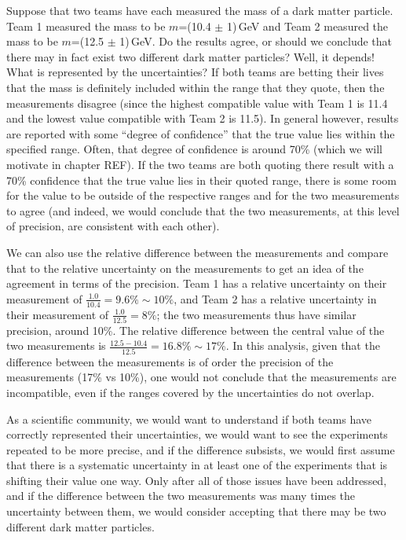 Suppose that two teams have each measured the mass of a dark matter particle. Team 1 measured the mass to be $m$=(10.4 $\pm$ 1)\,GeV and Team 2 measured the mass to be $m$=(12.5 $\pm$ 1)\,GeV. Do the results agree, or should we conclude that there may in fact exist two different dark matter particles? Well, it depends! What is represented by the uncertainties? If both teams are betting their lives that the mass is definitely included within the range that they quote, then the measurements disagree (since the highest compatible value with Team 1 is 11.4 and the lowest value compatible with Team 2 is 11.5). In general however, results are reported with some ``degree of confidence'' that the true value lies within the specified range. Often, that degree of confidence is around 70\% (which we will motivate in chapter REF). If the two teams are both quoting there result with a 70\% confidence that the true value lies in their quoted range, there is some room for the value to be outside of the respective ranges and for the two measurements to agree (and indeed, we would conclude that the two measurements, at this level of precision, are consistent with each other).

We can also use the relative difference between the measurements and compare that to the relative uncertainty on the measurements to get an idea of the agreement in terms of the precision. Team 1 has a relative uncertainty on their measurement of $\frac{1.0}{10.4}=9.6\%\sim 10\%$, and Team 2 has a relative uncertainty in their measurement of $\frac{1.0}{12.5}=8\%$; the two measurements thus have similar precision, around 10\%. The relative difference between the central value of the two measurements is $\frac{12.5-10.4}{12.5} = 16.8\% \sim 17\%$. In this analysis, given that the difference between the measurements is of order the precision of the measurements (17\% vs 10\%), one would not conclude that the measurements are incompatible, even if the ranges covered by the uncertainties do not overlap.

As a scientific community, we would want to understand if both teams have correctly represented their uncertainties, we would want to see the experiments repeated to be more precise, and if the difference subsists, we would first assume that there is a systematic uncertainty in at least one of the experiments that is shifting their value one way. Only after all of those issues have been addressed, and if the difference between the two measurements was many times the uncertainty between them, we would consider accepting that there may be two different dark matter particles.

